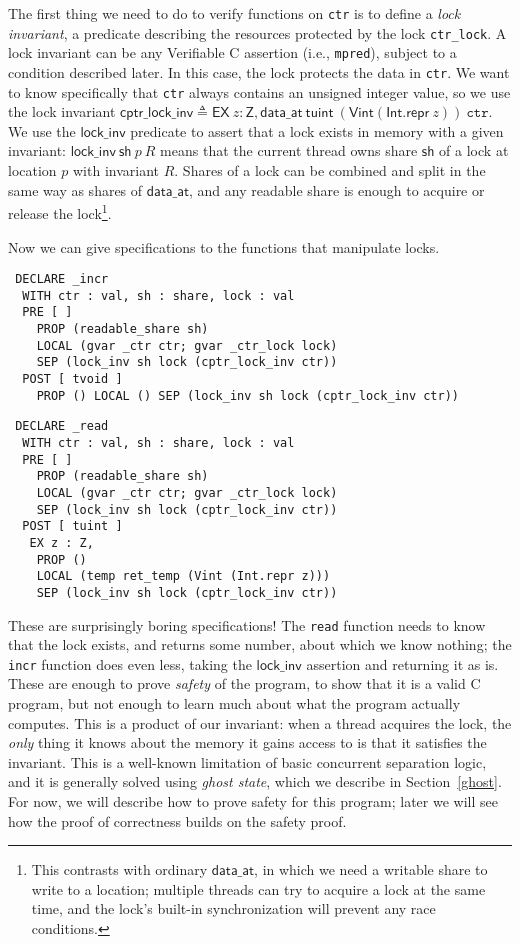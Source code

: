 \documentclass[11pt]{article} %
\begin{document}
The first thing we need to do to verify functions on \texttt{ctr} is to define a \emph{lock invariant}, a predicate describing the resources protected by the lock \texttt{ctr\_lock}. A lock invariant can be any Verifiable C assertion (i.e., \texttt{mpred}), subject to a condition described later. In this case, the lock protects the data in \texttt{ctr}. We want to know specifically that \texttt{ctr} always contains an unsigned integer value, so we use the lock invariant $\mathsf{cptr\_lock\_inv} \triangleq \mathsf{EX}\ z : \mathsf{Z}, \mathsf{data\_at}\ \mathsf{tuint}\ (\mathsf{Vint} (\mathsf{Int.repr}\ z))\ \texttt{ctr}$. We use the $\mathsf{lock\_inv}$ predicate to assert that a lock exists in memory with a given invariant: $\mathsf{lock\_inv}\ \mathsf{sh}\ p\ R$ means that the current thread owns share $\mathsf{sh}$ of a lock at location $p$ with invariant $R$. Shares of a lock can be combined and split in the same way as shares of $\mathsf{data\_at}$, and any readable share is enough to acquire or release the lock\footnote{This contrasts with ordinary $\mathsf{data\_at}$, in which we need a writable share to write to a location; multiple threads can try to acquire a lock at the same time, and the lock's built-in synchronization will prevent any race conditions.}.

Now we can give specifications to the functions that manipulate locks.
\begin{verbatim}
 DECLARE _incr
  WITH ctr : val, sh : share, lock : val
  PRE [ ]
    PROP (readable_share sh)
    LOCAL (gvar _ctr ctr; gvar _ctr_lock lock)
    SEP (lock_inv sh lock (cptr_lock_inv ctr))
  POST [ tvoid ]
    PROP () LOCAL () SEP (lock_inv sh lock (cptr_lock_inv ctr))
\end{verbatim}

\begin{verbatim}
 DECLARE _read
  WITH ctr : val, sh : share, lock : val
  PRE [ ]
    PROP (readable_share sh)
    LOCAL (gvar _ctr ctr; gvar _ctr_lock lock)
    SEP (lock_inv sh lock (cptr_lock_inv ctr))
  POST [ tuint ]
   EX z : Z,
    PROP ()
    LOCAL (temp ret_temp (Vint (Int.repr z)))
    SEP (lock_inv sh lock (cptr_lock_inv ctr))
\end{verbatim}
These are surprisingly boring specifications! The \texttt{read} function needs to know that the lock exists, and returns some number, about which we know nothing; the \texttt{incr} function does even less, taking the $\mathsf{lock\_inv}$ assertion and returning it as is. These are enough to prove \emph{safety} of the program, to show that it is a valid C program, but not enough to learn much about what the program actually computes. This is a product of our invariant: when a thread acquires the lock, the \emph{only} thing it knows about the memory it gains access to is that it satisfies the invariant. This is a well-known limitation of basic concurrent separation logic, and it is generally solved using \emph{ghost state}, which we describe in Section~\ref{ghost}. For now, we will describe how to prove safety for this program; later we will see how the proof of correctness builds on the safety proof.
\end{document}
